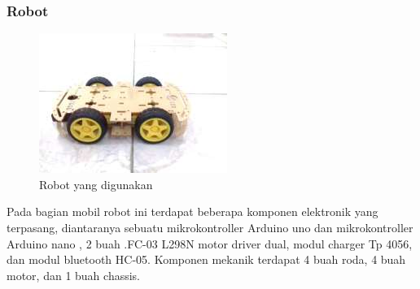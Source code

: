\subsubsection{Robot}
  \begin{figure}[!h]
    \centering
    \includegraphics[width=0.7\linewidth]{"gambar/robot"}
    \caption{Robot yang digunakan \parencite{JurnalElectroLuecat}}
    \label{fig:gambarrobot}
  \end{figure}
  Pada bagian mobil robot ini terdapat beberapa komponen elektronik yang terpasang, diantaranya sebuatu mikrokontroller Arduino uno dan mikrokontroller Arduino nano , 2 buah .FC-03 L298N motor driver dual, modul charger Tp 4056, dan modul bluetooth HC-05. Komponen mekanik terdapat 4 buah roda, 4 buah motor, dan 1 buah chassis.

